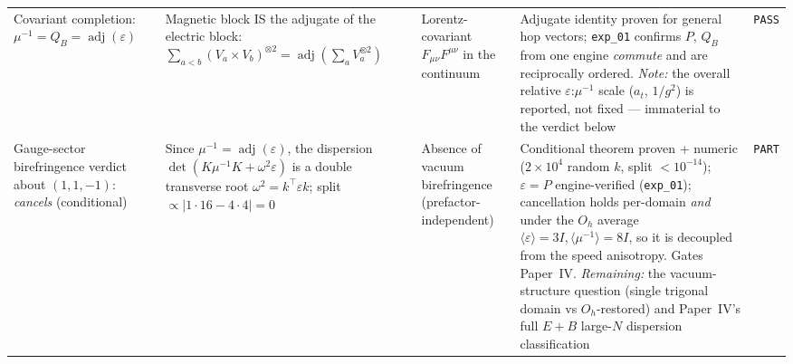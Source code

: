 {\begin{longtable}{@{}p{2.6cm}p{3.8cm}p{3.2cm}p{4.4cm}p{1.0cm}@{}}
Covariant completion: $\mu^{-1} = Q_B = \operatorname{adj}(\varepsilon)$
    & Magnetic block IS the adjugate of the electric block:
      $\sum_{a<b}(V_a\!\times\!V_b)^{\otimes 2}=\operatorname{adj}(\sum_a V_a^{\otimes 2})$
    & Lorentz-covariant $F_{\mu\nu}F^{\mu\nu}$ in the continuum
    & Adjugate identity proven for general hop vectors; \texttt{exp\_01} confirms $P$, $Q_B$
      from one engine \emph{commute} and are reciprocally ordered. \emph{Note:} the overall
      relative $\varepsilon$:$\mu^{-1}$ scale ($a_t$, $1/g^2$) is reported, not fixed ---
      immaterial to the verdict below
    & \texttt{PASS} \\

Gauge-sector birefringence verdict about $(1,1,-1)$: \emph{cancels} (conditional)
    & Since $\mu^{-1}=\operatorname{adj}(\varepsilon)$, the dispersion
      $\det(K\mu^{-1}K+\omega^2\varepsilon)$ is a double transverse root
      $\omega^2=k^{\!\top}\!\varepsilon k$; split $\propto|1\!\cdot\!16-4\!\cdot\!4|=0$
    & Absence of vacuum birefringence (prefactor-independent)
    & Conditional theorem proven + numeric ($2\times10^4$ random $k$, split $<10^{-14}$);
      $\varepsilon=P$ engine-verified (\texttt{exp\_01}); cancellation holds per-domain
      \emph{and} under the $O_h$ average $\langle\varepsilon\rangle{=}3I,\langle\mu^{-1}
      \rangle{=}8I$, so it is decoupled from the speed anisotropy. Gates Paper~IV. \emph{Remaining:}
      the vacuum-structure question (single trigonal domain vs $O_h$-restored) and Paper~IV's
      full $E{+}B$ large-$N$ dispersion classification
    & \texttt{PART} \\

\hline
\end{longtable}
}
